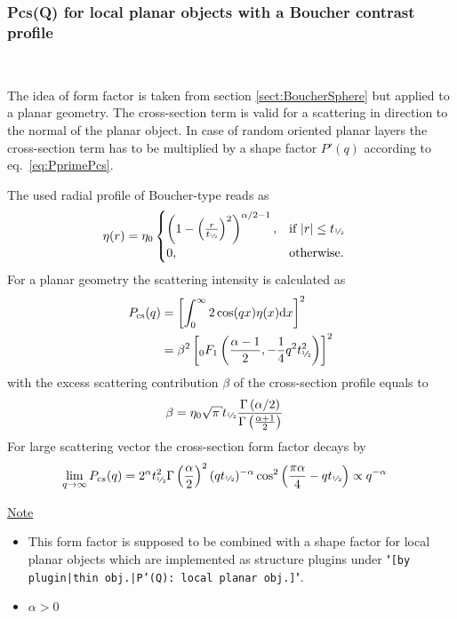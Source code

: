 \subsubsection{Pcs(Q) for local planar objects with a Boucher contrast profile} ~\\
\label{plugin:Pcs:BoucherPlanar}

The idea of form factor is taken from section \ref{sect:BoucherSphere} but applied to a planar geometry. The cross-section term is valid for a scattering in direction to the normal of the planar object. In case of random oriented planar layers the cross-section term has to be multiplied by a shape factor $P'(q)$ according to eq.\ \ref{eq:PprimePcs}.


The used radial profile of Boucher-type \cite{Boucher1983} reads as
\begin{align}
\eta(r) &= \eta_0
  \begin{cases}
    \left(1-\left(\frac{r}{t_\text{\sfrac{1}{2}}}\right)^2\right)^{\alpha/2-1}, & \mbox{if } \abs{r}\leq t_\text{\sfrac{1}{2}} \\
    0, & \mbox{otherwise}.
  \end{cases}
\end{align}
For a planar geometry the scattering intensity is calculated as
\begin{align}\label{eq:Pcs_planarBoucher}
  P_\mathrm{cs}(q)&= \left[\int_0^\infty 2 \cos(qx) \eta(x) \mathrm{d}x \right]^2 \nonumber \\
                  &= \beta^2 \left[ {}_0F_1\left(\frac{\alpha-1}{2},-\frac14q^2t_\text{\sfrac{1}{2}}^2\right)\right]^2 \\
\end{align}
with the excess scattering contribution $\beta$ of the cross-section profile equals to
\begin{align}\label{eq:beta_cyl_boucher}
  \beta & = \eta_0 \sqrt{\pi} t_\text{\sfrac{1}{2}} \frac{\Gamma\left(\alpha/2\right)}{\Gamma\left(\frac{\alpha+1}{2}\right)}
\end{align}
For large scattering vector the cross-section form factor decays by
\begin{align}
  \lim_{q\to\infty}P_{cs}(q) &= 2^{\alpha } t_\text{\sfrac{1}{2}}^2 \Gamma \left(\frac{\alpha }{2}\right)^2 (q t_\text{\sfrac{1}{2}})^{-\alpha } \cos ^2\left(\frac{\pi  \alpha }{4}-q t_\text{\sfrac{1}{2}}\right) \propto q^{-\alpha}
\end{align}

\noindent
\uline{Note}
\begin{itemize}
  \item This form factor is supposed to be combined with a shape factor for
local planar objects which are implemented as structure  plugins
under "\texttt{[by plugin|thin obj.|P'(Q): local planar
obj.]}".
\item $\alpha > 0$
\end{itemize}

